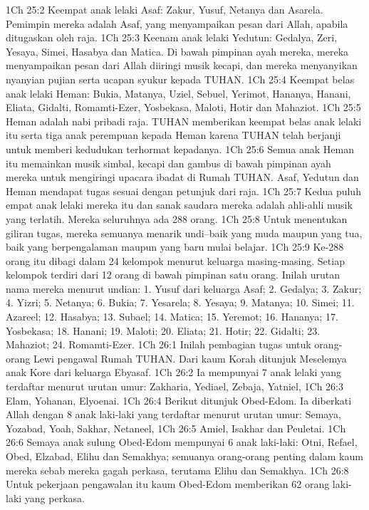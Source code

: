 1Ch 25:2  Keempat anak lelaki Asaf: Zakur, Yusuf, Netanya dan Asarela. Pemimpin mereka adalah Asaf, yang menyampaikan pesan dari Allah, apabila ditugaskan oleh raja.
1Ch 25:3  Keenam anak lelaki Yedutun: Gedalya, Zeri, Yesaya, Simei, Hasabya dan Matica. Di bawah pimpinan ayah mereka, mereka menyampaikan pesan dari Allah diiringi musik kecapi, dan mereka menyanyikan nyanyian pujian serta ucapan syukur kepada TUHAN.
1Ch 25:4  Keempat belas anak lelaki Heman: Bukia, Matanya, Uziel, Sebuel, Yerimot, Hananya, Hanani, Eliata, Gidalti, Romamti-Ezer, Yosbekasa, Maloti, Hotir dan Mahaziot.
1Ch 25:5  Heman adalah nabi pribadi raja. TUHAN memberikan keempat belas anak lelaki itu serta tiga anak perempuan kepada Heman karena TUHAN telah berjanji untuk memberi kedudukan terhormat kepadanya.
1Ch 25:6  Semua anak Heman itu memainkan musik simbal, kecapi dan gambus di bawah pimpinan ayah mereka untuk mengiringi upacara ibadat di Rumah TUHAN. Asaf, Yedutun dan Heman mendapat tugas sesuai dengan petunjuk dari raja.
1Ch 25:7  Kedua puluh empat anak lelaki mereka itu dan sanak saudara mereka adalah ahli-ahli musik yang terlatih. Mereka seluruhnya ada 288 orang.
1Ch 25:8  Untuk menentukan giliran tugas, mereka semuanya menarik undi--baik yang muda maupun yang tua, baik yang berpengalaman maupun yang baru mulai belajar.
1Ch 25:9  Ke-288 orang itu dibagi dalam 24 kelompok menurut keluarga masing-masing. Setiap kelompok terdiri dari 12 orang di bawah pimpinan satu orang. Inilah urutan nama mereka menurut undian: 1. Yusuf dari keluarga Asaf; 2. Gedalya; 3. Zakur; 4. Yizri; 5. Netanya; 6. Bukia; 7. Yesarela; 8. Yesaya; 9. Matanya; 10. Simei; 11. Azareel; 12. Hasabya; 13. Subael; 14. Matica; 15. Yeremot; 16. Hananya; 17. Yosbekasa; 18. Hanani; 19. Maloti; 20. Eliata; 21. Hotir; 22. Gidalti; 23. Mahaziot; 24. Romamti-Ezer.
1Ch 26:1  Inilah pembagian tugas untuk orang-orang Lewi pengawal Rumah TUHAN. Dari kaum Korah ditunjuk Meselemya anak Kore dari keluarga Ebyasaf.
1Ch 26:2  Ia mempunyai 7 anak lelaki yang terdaftar menurut urutan umur: Zakharia, Yediael, Zebaja, Yatniel,
1Ch 26:3  Elam, Yohanan, Elyoenai.
1Ch 26:4  Berikut ditunjuk Obed-Edom. Ia diberkati Allah dengan 8 anak laki-laki yang terdaftar menurut urutan umur: Semaya, Yozabad, Yoah, Sakhar, Netaneel,
1Ch 26:5  Amiel, Isakhar dan Peuletai.
1Ch 26:6  Semaya anak sulung Obed-Edom mempunyai 6 anak laki-laki: Otni, Refael, Obed, Elzabad, Elihu dan Semakhya; semuanya orang-orang penting dalam kaum mereka sebab mereka gagah perkasa, terutama Elihu dan Semakhya.
1Ch 26:8  Untuk pekerjaan pengawalan itu kaum Obed-Edom memberikan 62 orang laki-laki yang perkasa.
